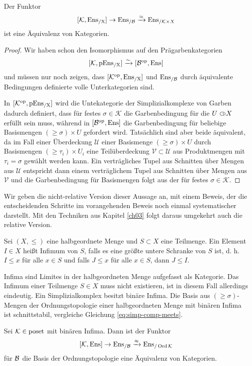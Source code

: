 \begin{satz} \label{sheaf-simp-compl}
  Der Funktor
  \[
  [\mathcal{K}, \operatorname{Ens_{/X}}] \to \operatorname{Ens_{/\mathcal{B}}} \xrightarrow{\approx} \operatorname{Ens}_{/\mathcal{K} \times X}
  \]
  ist eine Äquivalenz von Kategorien.
\end{satz}
\begin{proof}
  Wir haben schon den Isomorphismus auf den Prägarbenkategorien
  \[ [\mathcal{K}, \operatorname{pEns_{/X}}] \xrightarrow[]{\sim} {[\mathcal{B}^\mathrm{op}, \operatorname{Ens}]} \]
  und müssen nur noch zeigen, dass $[\mathcal{K}^\mathrm{op}, \operatorname{Ens_{/X}}]$ und
  $\operatorname{Ens_{/\mathcal{B}}}$ durch äquivalente Bedingungen definierte volle
  Unterkategorien sind.

  In $[\mathcal{K}^\mathrm{op}, \operatorname{pEns_{/X}}]$ wird die Untekategorie der
  Simplizialkomplexe von Garben dadurch definiert, dass für festes
  $\sigma \in \mathcal{K}$ die Garbenbedingung für die $U \subset\kern-0.58em\circ X$
  erfüllt sein muss, während in $[\mathcal{B}^\mathrm{op}, \operatorname{Ens}]$ die Garbenbedingung
  für beliebige Basismengen $(\geq \sigma) \times U$ gefordert
  wird. Tatsächlich sind aber beide äquivalent, da im Fall einer
  Überdeckung $\mathcal{U}$ einer Basismenge $(\geq \sigma) \times U$
  durch Basismengen $(\geq \tau_i) \times U_i$ eine Teilüberdeckung
  $\mathcal{V} \subset \mathcal{U}$ aus Produktmengen mit $\tau_i =
  \sigma$ gewählt werden kann. Ein verträgliches Tupel aus Schnitten
  über Mengen aus $\mathcal{U}$ entspricht dann einem verträglichem
  Tupel aus Schnitten über Mengen aus $\mathcal{V}$ und die
  Garbenbedingung für Basismengen folgt aus der für festes
  $\sigma \in \mathcal{K}$.
\end{proof}
Wir geben die nicht-relative Version dieser Aussage an, mit einem
Beweis, der die entscheidenden Schritte im vorangehenden Beweis noch
einmal systematischer darstellt. Mit den Techniken aus Kapitel
\ref{ch03} folgt daraus umgekehrt auch die relative Version.
\begin{defn}
  Sei $(X, \leq)$ eine halbgeordnete Menge und $S \subset X$ eine
  Teilmenge. Ein Element $I \in X$ heißt Infimum von $S$, falls es
  eine größte untere Schranke von $S$ ist, d. h. $I \leq x$ für alle
  $x \in S$ und falls $J \leq x$ für alle $x \in S$, dann $J \leq I$.
\end{defn}
Infima sind Limites in der halbgeordneten Menge aufgefasst als
Kategorie. Das Infimum einer Teilmenge $S \in X$ muss nicht
existieren, ist in diesem Fall allerdings eindeutig. Ein
Simplizialkomplex besitzt binäre Infima. Die Basis aus $(\geq
\sigma)$-Mengen der Ordnungstopologie einer halbgeordneten Menge mit
binären Infima ist schnittstabil, vergleiche Gleichung
\ref{eq:simp-comp-meets}.
\begin{satz} \label{sheaf-order-top}
  Sei $\mathcal{K} \in \operatorname{poset}$ mit binären Infima. Dann ist der Funktor
  \[
  [\mathcal{K}, \operatorname{Ens}] \to \operatorname{Ens_{/\mathcal{B}}} \xrightarrow{\approx} \operatorname{Ens}_{/\operatorname{Ord} \mathcal{K}}
  \]
  für $\mathcal{B}$ die Basis der Ordnungstopologie eine Äquivalenz von
  Kategorien.
\end{satz}
